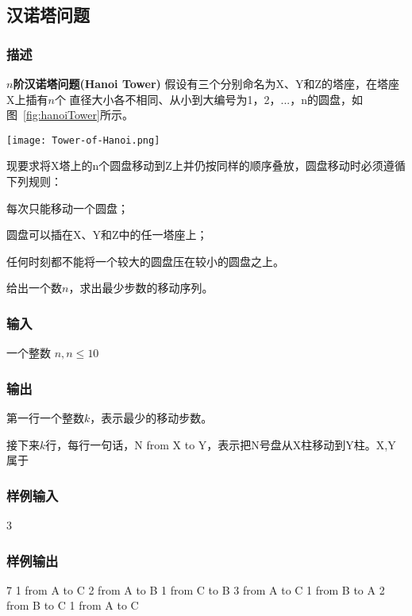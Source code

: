 \subsection{汉诺塔问题}


\subsubsection{描述}
\textbf{$n$阶汉诺塔问题(Hanoi Tower)} 假设有三个分别命名为X、Y和Z的塔座，在塔座X上插有$n$个
直径大小各不相同、从小到大编号为1，2，...，n的圆盘，如图~\ref{fig:hanoiTower}所示。

\begin{center}
\texttt{[image: Tower-of-Hanoi.png]}\\
\label{fig:hanoiTower}
\end{center}


现要求将X塔上的n个圆盘移动到Z上并仍按同样的顺序叠放，圆盘移动时必须遵循下列规则：
\begindot
\item 每次只能移动一个圆盘；
\item 圆盘可以插在X、Y和Z中的任一塔座上；
\item 任何时刻都不能将一个较大的圆盘压在较小的圆盘之上。
\myenddot
 
给出一个数$n$，求出最少步数的移动序列。


\subsubsection{输入}
一个整数 $n, n \leq 10$


\subsubsection{输出}
第一行一个整数$k$，表示最少的移动步数。

接下来$k$行，每行一句话，N from X to Y，表示把N号盘从X柱移动到Y柱。X,Y 属于


\subsubsection{样例输入}
\begin{Code}
3
\end{Code}


\subsubsection{样例输出}
\begin{Code}
7
1 from A to C
2 from A to B
1 from C to B
3 from A to C
1 from B to A
2 from B to C
1 from A to C
\end{Code}

